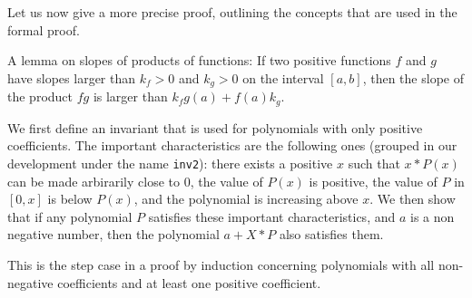 \documentclass{article}
\begin{document}
Let us now give a more precise proof, outlining the concepts that are
used in the formal proof.

{\sf A lemma on slopes of products of functions: If two positive functions \(f\)
and \(g\) have slopes larger than \(k_f > 0\) and \(k_g > 0\) on the interval
\([a,b]\), then the slope
of the product \(fg\) is larger than \(k_fg(a) + f(a)k_g\).  }

We first define an invariant that is used for polynomials with only
positive coefficients.  The important characteristics are the
following ones (grouped in our development under the name {\tt inv2}):
there exists a positive \(x\) such that \(x * P(x)\)
can be made arbirarily close to 0, the value of \(P(x)\) is positive,
the value of \(P\) in \([0,x]\) is below \(P(x)\), and the polynomial
is increasing above \(x\).  We then show that if any polynomial \(P\)
satisfies these important characteristics, and \(a\) is a non negative
number, then the polynomial \(a + X * P\) also satisfies them.

This is the step case in a proof by induction concerning polynomials
with all non-negative coefficients and at least one positive coefficient.
\end{document}
